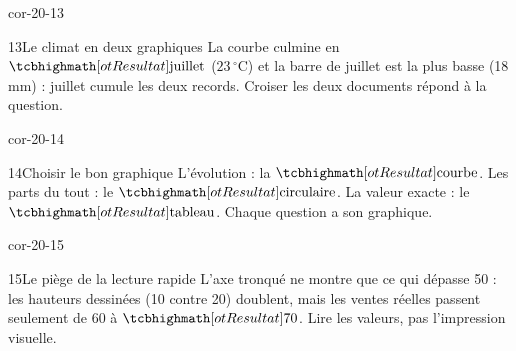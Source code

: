 \begin{blocLivre}{cor-20-13}\begin{corrige}{13}{Le climat en deux graphiques}
La courbe culmine en $\res{\text{juillet}}$ ($23\,^\circ$C) et la barre de juillet est la plus basse (18 mm) : juillet cumule les deux records. Croiser les deux documents répond à la question.
\label{fig-cor-20-13}
\end{corrige}\end{blocLivre}
\begin{blocLivre}{cor-20-14}\begin{corrige}{14}{Choisir le bon graphique}
L’évolution : la $\res{\text{courbe}}$. Les parts du tout : le $\res{\text{circulaire}}$. La valeur exacte : le $\res{\text{tableau}}$. Chaque question a son graphique.
\end{corrige}\end{blocLivre}
\begin{blocLivre}{cor-20-15}\begin{corrige}{15}{Le piège de la lecture rapide}
L’axe tronqué ne montre que ce qui dépasse 50 : les hauteurs dessinées (10 contre 20) doublent, mais les ventes réelles passent seulement de 60 à $\res{70}$. Lire les valeurs, pas l’impression visuelle.
\end{corrige}\end{blocLivre}
